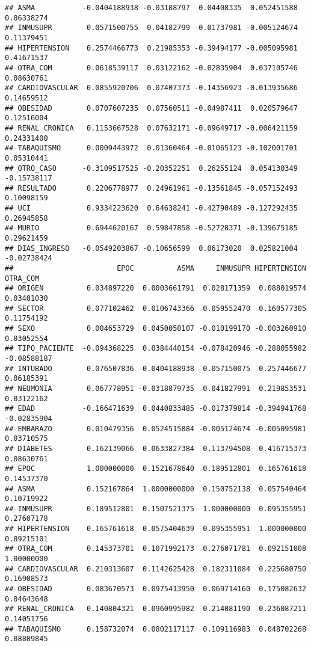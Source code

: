 \documentclass[]{article}
\begin{document}
\begin{verbatim}
## ASMA           -0.0404188938 -0.03188797  0.04408335  0.052451588  0.06338274
## INMUSUPR        0.0571500755  0.04182799 -0.01737981 -0.005124674  0.11379451
## HIPERTENSION    0.2574466773  0.21985353 -0.39494177 -0.005095981  0.41671537
## OTRA_COM        0.0618539117  0.03122162 -0.02835904  0.037105746  0.08630761
## CARDIOVASCULAR  0.0855920706  0.07407373 -0.14356923 -0.013935686  0.14659512
## OBESIDAD        0.0707607235  0.07560511 -0.04987411  0.020579647  0.12516004
## RENAL_CRONICA   0.1153667528  0.07632171 -0.09649717 -0.006421159  0.24331400
## TABAQUISMO      0.0009443972  0.01360464 -0.01065123 -0.102001701  0.05310441
## OTRO_CASO      -0.3109517525 -0.20352251  0.26255124  0.054130349 -0.15738117
## RESULTADO       0.2206778977  0.24961961 -0.13561845 -0.057152493  0.10098159
## UCI             0.9334223620  0.64638241 -0.42790489 -0.127292435  0.26945858
## MURIO           0.6944620167  0.59847858 -0.52728371 -0.139675185  0.29621459
## DIAS_INGRESO   -0.0549203867 -0.10656599  0.06173020  0.025821004 -0.02738424
##                        EPOC          ASMA     INMUSUPR HIPERTENSION    OTRA_COM
## ORIGEN          0.034897220  0.0003661791  0.028171359  0.088019574  0.03401030
## SECTOR          0.077102462  0.0106743366  0.059552470  0.160577305  0.11754192
## SEXO            0.004653729  0.0450050107 -0.010199170 -0.003260910  0.03052554
## TIPO_PACIENTE  -0.094368225  0.0384440154 -0.078420946 -0.288055982 -0.08588187
## INTUBADO        0.076507836 -0.0404188938  0.057150075  0.257446677  0.06185391
## NEUMONIA        0.067778951 -0.0318879735  0.041827991  0.219853531  0.03122162
## EDAD           -0.166471639  0.0440833485 -0.017379814 -0.394941768 -0.02835904
## EMBARAZO        0.010479356  0.0524515884 -0.005124674 -0.005095981  0.03710575
## DIABETES        0.162139066  0.0633827384  0.113794508  0.416715373  0.08630761
## EPOC            1.000000000  0.1521678640  0.189512801  0.165761618  0.14537370
## ASMA            0.152167864  1.0000000000  0.150752138  0.057540464  0.10719922
## INMUSUPR        0.189512801  0.1507521375  1.000000000  0.095355951  0.27607178
## HIPERTENSION    0.165761618  0.0575404639  0.095355951  1.000000000  0.09215101
## OTRA_COM        0.145373701  0.1071992173  0.276071781  0.092151008  1.00000000
## CARDIOVASCULAR  0.210313607  0.1142625428  0.182311084  0.225680750  0.16908573
## OBESIDAD        0.083670573  0.0975413950  0.069714160  0.175082632  0.04643648
## RENAL_CRONICA   0.140804321  0.0960995982  0.214081190  0.236087211  0.14051756
## TABAQUISMO      0.158732074  0.0802117117  0.109116983  0.048702268  0.08809845

\end{verbatim}
\end{document}

